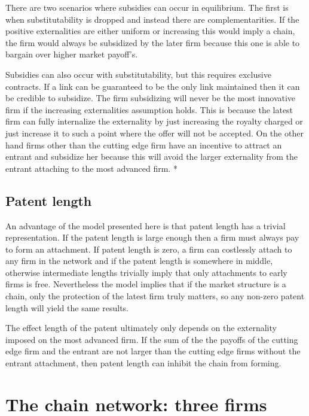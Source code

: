 \documentclass{article}
\begin{document}
There are two scenarios where subsidies can occur in equilibrium. The first is when substitutability is dropped and instead there are complementarities. If the positive externalities are either uniform or increasing this would imply a chain, the firm would always be subsidized by the later firm because this one is able to bargain over higher market payoff's. 

Subsidies can also occur with substitutability, but this requires exclusive contracts. If a link can be guaranteed to be the only link maintained then it can be credible to subsidize. The firm subsidizing will never be the most innovative firm if the increasing externalities assumption holds. This is because the latest firm can fully internalize the externality by just increasing the royalty charged or just increase it to such a point where the offer will not be accepted. On the other hand firms other than the cutting edge firm have an incentive to attract an entrant and subsidize her because this will avoid the larger externality from the entrant attaching to the most advanced firm. *

\subsection{Patent length}

An advantage of the model presented here is that patent length has a trivial representation. If the patent length is large enough then a firm must always pay to form an attachment. If patent length is zero, a firm can costlessly attach to any firm in the network and if the patent length is somewhere in middle, otherwise intermediate lengths trivially imply that only attachments to early firms is free. Nevertheless the model implies that if the market structure is a chain, only the protection of the latest firm truly matters, so any non-zero patent length will yield the same results. 

The effect length of the patent ultimately only depends on the externality imposed on the most advanced firm. If the sum of the the payoffs of the cutting edge firm and the entrant are not larger than the cutting edge firms without the entrant attachment, then patent length can inhibit the chain from forming. 

\section{The chain network: three firms}
\end{document}
